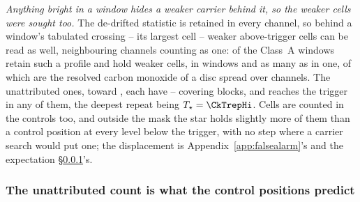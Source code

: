\emph{Anything bright in a window hides a weaker carrier behind it, so the
weaker cells were sought too.} The de-drifted statistic is retained in every
channel, so behind a window's tabulated crossing -- its largest cell --
weaker above-trigger cells can be read as well, neighbouring channels counting
as one: \CkNWin{} of the \NWinA{} Class~A windows retain such a profile and
hold \CkNSecondaryWord{} weaker cells, in \CkNSecWin{}
windows and as many as \CkNSecMax{} in one, of which \CkNSecAttr{}
are the resolved carbon monoxide of a disc spread over channels. The
\CkNSecUnattrWord{} unattributed ones, toward \CkSecStars, each have
\CkCovLo--\CkCovHi{} covering blocks, and \CkNRecurWord{} reaches the trigger
in any of them, the deepest repeat being $T_\star=\CkTrepHi$.
Cells are counted in the controls too, and outside the mask the star holds
slightly more of them than a control position at every level below the
trigger, with no step where a carrier search would put one; the displacement
is Appendix~\ref{app:falsealarm}'s and the expectation \S\ref{sec:trigunif}'s.

\subsubsection{The unattributed count is what the control positions predict}
\label{sec:trigunif}

